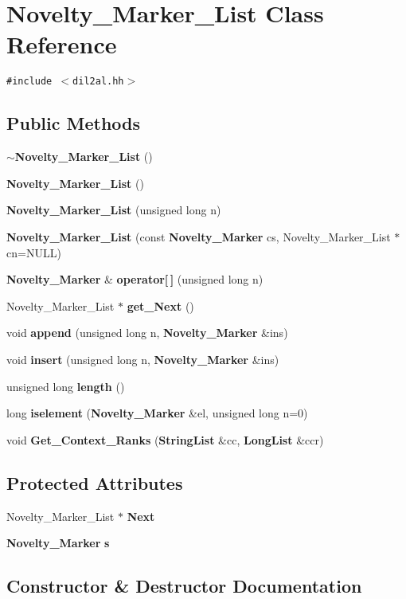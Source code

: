 \section{Novelty\_\-Marker\_\-List  Class Reference}
\label{classNovelty__Marker__List}
{\tt \#include $<$dil2al.hh$>$}

\subsection*{Public Methods}
\begin{CompactItemize}
\item 
{\bf $\sim$Novelty\_\-Marker\_\-List} ()
\item 
{\bf Novelty\_\-Marker\_\-List} ()
\item 
{\bf Novelty\_\-Marker\_\-List} (unsigned long n)
\item 
{\bf Novelty\_\-Marker\_\-List} (const {\bf Novelty\_\-Marker} cs, Novelty\_\-Marker\_\-List $\ast$cn=NULL)
\item 
{\bf Novelty\_\-Marker} \& {\bf operator[$\,$]} (unsigned long n)
\item 
Novelty\_\-Marker\_\-List $\ast$ {\bf get\_\-Next} ()
\item 
void {\bf append} (unsigned long n, {\bf Novelty\_\-Marker} \&ins)
\item 
void {\bf insert} (unsigned long n, {\bf Novelty\_\-Marker} \&ins)
\item 
unsigned long {\bf length} ()
\item 
long {\bf iselement} ({\bf Novelty\_\-Marker} \&el, unsigned long n=0)
\item 
void {\bf Get\_\-Context\_\-Ranks} ({\bf String\-List} \&cc, {\bf Long\-List} \&ccr)
\end{CompactItemize}
\subsection*{Protected Attributes}
\begin{CompactItemize}
\item 
Novelty\_\-Marker\_\-List $\ast$ {\bf Next}
\item 
{\bf Novelty\_\-Marker} {\bf s}
\end{CompactItemize}


\subsection{Constructor \& Destructor Documentation}
